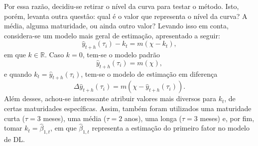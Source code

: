 \documentclass[
	12pt,				%
	openright,			%
	oneside,			%
	a4paper,			%
	english,			%
	brazil				%
	]{dissertacao-ufrgs-abntex2}
\begin{document}
Por essa razão, decidiu-se retirar o nível da curva para testar o método. Isto, porém, levanta outra questâo: qual é o valor que representa o nível da curva? A média, alguma maturidade, ou ainda outro valor? Levando isso em conta, considera-se um modelo mais geral de estimação, apresentado a seguir:
\begin{equation}
\hat{y}_{t+h}(\tau_i) - k_t = m(\chi - k_t),
\end{equation}
em que $k \in \mathbb{R}$. Caso $k=0$, tem-se o modelo padrão
\begin{equation}
\hat{y}_{t+h}(\tau_i) = m(\chi),
\end{equation}
e quando $k_t = \hat{y}_{t+h}(\tau_i)$, tem-se o modelo de estimação em diferença
\begin{equation}
\Delta \hat{y}_{t+h}(\tau_i)= m(\chi - \hat{y}_{t+h}(\tau_i)).
\end{equation}
Além desses, achou-se interessante atribuir valores mais diversos para $k_t$, de certas maturidades específicas. Assim, também foram utilizados uma maturidade curta ($\tau = 3$ meses), uma média ($\tau = 2$ anos), uma longa ($\tau = 3$ meses) e, por fim, tomar $k_t = \hat{\beta}_{1,t}$, em que $\hat{\beta}_{1,t}$ representa a estimação do primeiro fator no modelo de DL. 
\end{document}
